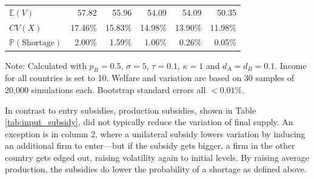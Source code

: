 \documentclass{article}
\begin{document}
\begin{table}
\begin{threeparttable}
\begin{tabular}{lrrrrr}
            $\mathbb{E}(V)$ & 57.82 & 55.96 & 54.09 & 54.09 & 50.35 \\
            $CV(X)$ & 17.46\% & 15.83\% & 14.98\% & 13.90\% & 11.98\% \\
            $\mathbb{P}(\text{Shortage})$ & 2.00\% & 1.59\% & 1.06\% & 0.26\% & 0.05\% \\ 
            \bottomrule
        \end{tabular}
        \begin{tablenotes}
            \small \item Note: Calculated with $p_R = 0.5$, $\sigma = 5$, $\tau = 0.1$, $\kappa = 1$ and $d_A = d_B = 0.1$. Income for all countries is set to 10. Welfare and variation are based on 30 samples of 20,000 simulations each. Bootstrap standard errors all $<0.01\%$.
        \end{tablenotes}
    \end{threeparttable}
\end{table}

In contrast to entry subsidies, production subsidies, shown in Table \ref{tab:input_subsidy}, did not typically reduce the variation of final supply. An exception is in column 2, where a unilateral subsidy lowers variation by inducing an additional firm to enter---but if the subsidy gets bigger, a firm in the other country gets edged out, raising volatility again to initial levels. By raising average production, the subsidies do lower the probability of a shortage as defined above.
\end{document}
